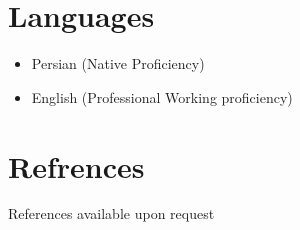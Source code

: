\documentclass[11pt,a4paper,sans]{moderncv}
\begin{document}
\section{ Languages}
\begin{itemize}
    \item Persian (Native Proficiency)
    \item English (Professional Working proficiency)
\end{itemize}
\section{ Refrences}
References available upon request
\end{document}
